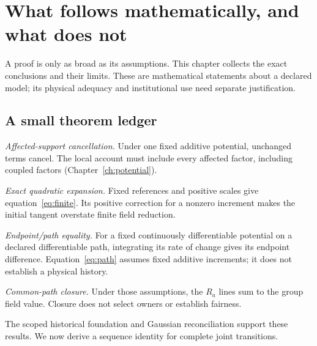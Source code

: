 \chapter{What follows mathematically, and what does not}\label{ch:limits}

A proof is only as broad as its assumptions. This chapter collects the exact conclusions and their limits. These are mathematical statements about a declared model; its physical adequacy and institutional use need separate justification.

\section{A small theorem ledger}
\textit{Affected-support cancellation.} Under one fixed additive potential, unchanged terms cancel. The local account must include every affected factor, including coupled factors (Chapter~\ref{ch:potential}).

\textit{Exact quadratic expansion.} Fixed references and positive scales give equation~\eqref{eq:finite}. Its positive correction for a nonzero increment makes the initial tangent overstate finite field reduction.

\textit{Endpoint/path equality.} For a fixed continuously differentiable potential on a declared differentiable path, integrating its rate of change gives its endpoint difference. Equation~\eqref{eq:path} assumes fixed additive increments; it does not establish a physical history.

\textit{Common-path closure.} Under those assumptions, the $R_a$ lines sum to the group field value. Closure does not select owners or establish fairness.

The scoped historical foundation and Gaussian reconciliation support these results.\cite{foundation,gaussian} We now derive a sequence identity for complete joint transitions.

